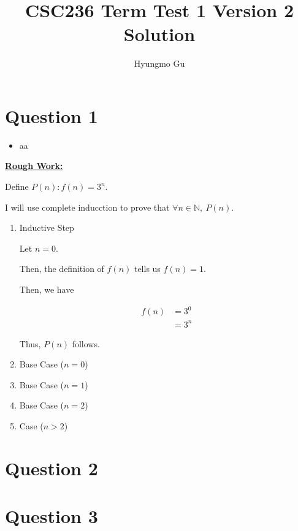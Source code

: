 \documentclass[12pt]{article}
\begin{document}
\title{CSC236 Term Test 1 Version 2 Solution}
\author{Hyungmo Gu}
\maketitle

\section*{Question 1}
\begin{itemize}
    \item

    aa
\end{itemize}

\bigskip

\begin{mdframed}
    \underline{\textbf{Rough Work:}}

    \bigskip

    Define $P(n):f(n) = 3^n$.

    \bigskip

    I will use complete inducction to prove that $\forall n \in \mathbb{N},\:P(n)$.

    \begin{enumerate}[1.]
        \item Inductive Step

        \begin{mdframed}
        Let $n = 0$.

        \bigskip

        Then, the definition of $f(n)$ tells us $f(n) = 1$.

        \bigskip

        Then, we have

        \begin{align}
            f(n) &= 3^0\\
            &= 3^n
        \end{align}

        \bigskip

        Thus, $P(n)$ follows.
        \end{mdframed}

        \item Base Case ($n = 0$)
        \item Base Case ($n = 1$)
        \item Base Case ($n = 2$)
        \item Case ($n > 2$)
    \end{enumerate}

\end{mdframed}

\section*{Question 2}

\section*{Question 3}
\end{document}

